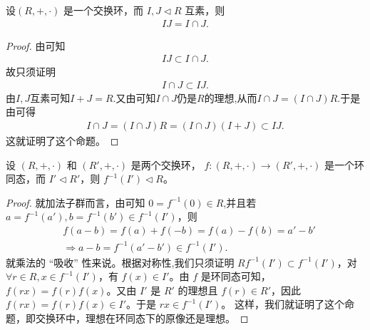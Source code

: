 \documentclass[../../main.tex]{subfiles}
\begin{document}
\begin{proposition}\label{proposition:理想的乘积等于理想的交当且仅当它们互素}
设$(R, +, \cdot)$ 是一个交换环，而 $I, J \lhd R$ 互素，则
\begin{align*}
IJ = I \cap J.
\end{align*}
\end{proposition}
\begin{proof}
由可知
\begin{align*}
IJ \subset I \cap J.
\end{align*}
故只须证明
\begin{align*}
I \cap J \subset IJ.
\end{align*}
由$I,J$互素可知$I+J=R$.又由可知$I\cap J$仍是$R$的理想,从而$I \cap J = (I \cap J)R .$于是由可得
\begin{align*}
I \cap J = (I \cap J)R = (I \cap J)(I + J) \subset IJ.
\end{align*}
这就证明了这个命题。

\end{proof}

\begin{proposition}\label{proposition:交换环中，理想在环同态下的原像还是理想}
设 $(R, +, \cdot)$ 和 $(R', +, \cdot)$ 是两个交换环， $f : (R, +, \cdot) \to (R', +, \cdot)$ 是一个环同态，而 $I' \lhd R'$，则 $f^{-1}(I') \lhd R$。
\end{proposition}
\begin{proof}
就加法子群而言，由可知 $0 = f^{-1}(0) \in R$,并且若 $a = f^{-1}(a'), b = f^{-1}(b') \in f^{-1}(I')$，则
\begin{align*}
&f\left( a-b \right) =f\left( a \right) +f\left( -b \right) =f\left( a \right) -f\left( b \right) =a' -b'
\\
&\Rightarrow a-b=f^{-1}(a'-b')\in f^{-1}(I' ).
\end{align*}
就乘法的 “吸收” 性来说。根据对称性,我们只须证明 $Rf^{-1}(I') \subset f^{-1}(I')$，对 $\forall r \in R, x \in f^{-1}(I')$，有 $f(x) \in I'$。由 $f$ 是环同态可知，$f(rx) = f(r)f(x)$。又由 $I'$ 是 $R'$ 的理想且 $f(r) \in R'$，因此 $f(rx) = f(r)f(x) \in I'$。于是 $rx \in f^{-1}(I')$。 
这样，我们就证明了这个命题，即交换环中，理想在环同态下的原像还是理想。 

\end{proof}
\end{document}
